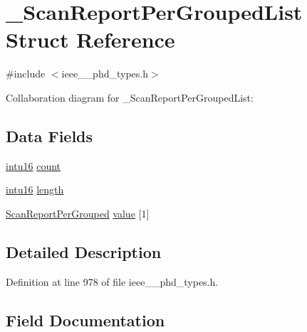 \hypertarget{struct___scan_report_per_grouped_list}{}\section{\+\_\+\+Scan\+Report\+Per\+Grouped\+List Struct Reference}
\label{struct___scan_report_per_grouped_list}


{\ttfamily \#include $<$ieee\+\_\+\_\+phd\+\_\+types.\+h$>$}



Collaboration diagram for \+\_\+\+Scan\+Report\+Per\+Grouped\+List\+:
\subsection*{Data Fields}
\begin{DoxyCompactItemize}
\item 
\hyperlink{ieee__11073__phd__types_8h_a3561595d2aa7416532e1c9910abd076d}{intu16} \hyperlink{struct___scan_report_per_grouped_list_abf6db060ae8e224764b0f867fb135ecd}{count}
\item 
\hyperlink{ieee__11073__phd__types_8h_a3561595d2aa7416532e1c9910abd076d}{intu16} \hyperlink{struct___scan_report_per_grouped_list_a3743679e4ff85e3e1b3fc2e59973fbb3}{length}
\item 
\hyperlink{ieee__11073__phd__types_8h_a524d1aa918ed17e8774cada544416784}{Scan\+Report\+Per\+Grouped} \hyperlink{struct___scan_report_per_grouped_list_ab3e68b5ffaa979f25c6834e357696166}{value} \mbox{[}1\mbox{]}
\end{DoxyCompactItemize}


\subsection{Detailed Description}


Definition at line 978 of file ieee\+\_\+\_\+phd\+\_\+types.\+h.



\subsection{Field Documentation}
\hypertarget{struct___scan_report_per_grouped_list_abf6db060ae8e224764b0f867fb135ecd}{}

